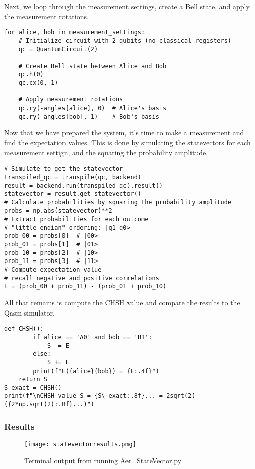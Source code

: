 \documentclass[12pt]{article}
\begin{document}
Next, we loop through the measurement settings, create a Bell state, and apply the measurement rotations. 

\begin{lstlisting}[style=python]
for alice, bob in measurement_settings:
    # Initialize circuit with 2 qubits (no classical registers)
    qc = QuantumCircuit(2)
    
    # Create Bell state between Alice and Bob
    qc.h(0)
    qc.cx(0, 1)
    
    # Apply measurement rotations
    qc.ry(-angles[alice], 0)  # Alice's basis
    qc.ry(-angles[bob], 1)    # Bob's basis
\end{lstlisting}

Now that we have prepared the system, it's time to make a measurement and find the expectation values. This is done by simulating the statevectors for each measurement settign, and the squaring the probability amplitude.

\begin{lstlisting}[style=python]
# Simulate to get the statevector
transpiled_qc = transpile(qc, backend)
result = backend.run(transpiled_qc).result()
statevector = result.get_statevector()
# Calculate probabilities by squaring the probability amplitude
probs = np.abs(statevector)**2
# Extract probabilities for each outcome
# "little-endian" ordering: |q1 q0>
prob_00 = probs[0]  # |00>
prob_01 = probs[1]  # |01>
prob_10 = probs[2]  # |10>
prob_11 = probs[3]  # |11>
# Compute expectation value
# recall negative and positive correlations
E = (prob_00 + prob_11) - (prob_01 + prob_10)
\end{lstlisting}


All that remains is compute the CHSH value and compare the results to the Qasm simulator.

\begin{lstlisting}[style=python]
def CHSH():
        if alice == 'A0' and bob == 'B1':
            S -= E
        else:
            S += E
        print(f"E({alice}{bob}) = {E:.4f}")
    return S
S_exact = CHSH()
print(f"\nCHSH value S = {S\_exact:.8f}... = 2sqrt(2) ({2*np.sqrt(2):.8f}...)")
\end{lstlisting}

\subsubsection{Results}
\begin{figure}[h]
    \centering
    \texttt{[image: statevectorresults.png]}
    \caption{Terminal output from running Aer\_StateVector.py}
    \label{fig:StateVector_results}
\end{figure}
\end{document}
